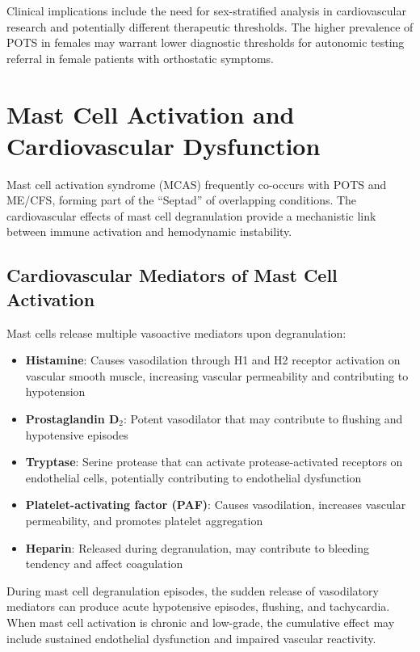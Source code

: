 Clinical implications include the need for sex-stratified analysis in cardiovascular research and potentially different therapeutic thresholds. The higher prevalence of POTS in females may warrant lower diagnostic thresholds for autonomic testing referral in female patients with orthostatic symptoms.

\section{Mast Cell Activation and Cardiovascular Dysfunction}
\label{sec:mcas-cardiovascular}

Mast cell activation syndrome (MCAS) frequently co-occurs with POTS and ME/CFS, forming part of the ``Septad'' of overlapping conditions. The cardiovascular effects of mast cell degranulation provide a mechanistic link between immune activation and hemodynamic instability.

\subsection{Cardiovascular Mediators of Mast Cell Activation}

Mast cells release multiple vasoactive mediators upon degranulation:

\begin{itemize}
    \item \textbf{Histamine}: Causes vasodilation through H1 and H2 receptor activation on vascular smooth muscle, increasing vascular permeability and contributing to hypotension
    \item \textbf{Prostaglandin D$_2$}: Potent vasodilator that may contribute to flushing and hypotensive episodes
    \item \textbf{Tryptase}: Serine protease that can activate protease-activated receptors on endothelial cells, potentially contributing to endothelial dysfunction
    \item \textbf{Platelet-activating factor (PAF)}: Causes vasodilation, increases vascular permeability, and promotes platelet aggregation
    \item \textbf{Heparin}: Released during degranulation, may contribute to bleeding tendency and affect coagulation
\end{itemize}

During mast cell degranulation episodes, the sudden release of vasodilatory mediators can produce acute hypotensive episodes, flushing, and tachycardia. When mast cell activation is chronic and low-grade, the cumulative effect may include sustained endothelial dysfunction and impaired vascular reactivity.

